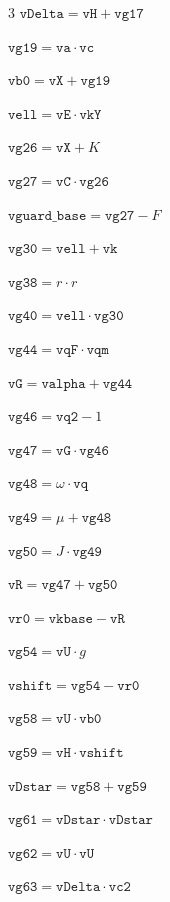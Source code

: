 \documentclass[10pt]{article}
\begin{document}
\begin{multicols}{3}
\noindent $\mathtt{vDelta} = \mathtt{vH}+\mathtt{vg17}$\par
\noindent $\mathtt{vg19} = \mathtt{va}\cdot \mathtt{vc}$\par
\noindent $\mathtt{vb0} = \mathtt{vX}+\mathtt{vg19}$\par
\noindent $\mathtt{vell} = \mathtt{vE}\cdot \mathtt{vkY}$\par
\noindent $\mathtt{vg26} = \mathtt{vX}+K$\par
\noindent $\mathtt{vg27} = \mathtt{vC}\cdot \mathtt{vg26}$\par
\noindent $\mathtt{vguard\_base} = \mathtt{vg27}-F$\par
\noindent $\mathtt{vg30} = \mathtt{vell}+\mathtt{vk}$\par
\noindent $\mathtt{vg38} = r\cdot r$\par
\noindent $\mathtt{vg40} = \mathtt{vell}\cdot \mathtt{vg30}$\par
\noindent $\mathtt{vg44} = \mathtt{vqF}\cdot \mathtt{vqm}$\par
\noindent $\mathtt{vG} = \mathtt{valpha}+\mathtt{vg44}$\par
\noindent $\mathtt{vg46} = \mathtt{vq2}-1$\par
\noindent $\mathtt{vg47} = \mathtt{vG}\cdot \mathtt{vg46}$\par
\noindent $\mathtt{vg48} = \omega\cdot \mathtt{vq}$\par
\noindent $\mathtt{vg49} = \mu+\mathtt{vg48}$\par
\noindent $\mathtt{vg50} = J\cdot \mathtt{vg49}$\par
\noindent $\mathtt{vR} = \mathtt{vg47}+\mathtt{vg50}$\par
\noindent $\mathtt{vr0} = \mathtt{vkbase}-\mathtt{vR}$\par
\noindent $\mathtt{vg54} = \mathtt{vU}\cdot g$\par
\noindent $\mathtt{vshift} = \mathtt{vg54}-\mathtt{vr0}$\par
\noindent $\mathtt{vg58} = \mathtt{vU}\cdot \mathtt{vb0}$\par
\noindent $\mathtt{vg59} = \mathtt{vH}\cdot \mathtt{vshift}$\par
\noindent $\mathtt{vDstar} = \mathtt{vg58}+\mathtt{vg59}$\par
\noindent $\mathtt{vg61} = \mathtt{vDstar}\cdot \mathtt{vDstar}$\par
\noindent $\mathtt{vg62} = \mathtt{vU}\cdot \mathtt{vU}$\par
\noindent $\mathtt{vg63} = \mathtt{vDelta}\cdot \mathtt{vc2}$\par

\end{multicols}
\end{document}
